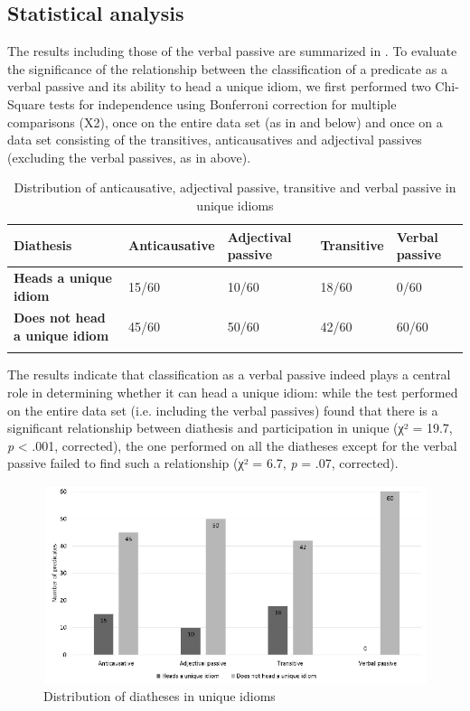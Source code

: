 \documentclass[output=paper]{langsci/langscibook}
\begin{document}
\subsection{Statistical analysis}  %

The results including those of the verbal passive are summarized in
. To evaluate the significance of the relationship between
the classification of a predicate as a verbal passive and its ability to head a
unique idiom, we first performed two Chi-Square tests for independence using
Bonferroni correction for multiple comparisons (X2), once on the entire data
set (as in  and  below) and once on a
data set consisting of the transitives, anticausatives and adjectival passives
(excluding the verbal passives, as in  above).

\begin{table}
\caption{Distribution of anticausative, adjectival passive,
transitive and verbal passive in unique idioms}\label{tab:key:20.2}
\begin{tabularx}{\textwidth}{lXXXX}
\lsptoprule
{\bfseries Diathesis} & {\bfseries Anti\-causative } & {\bfseries Adjectival passive} & {\bfseries Transitive} & {\bfseries Verbal passive}\\
\midrule
{\bfseries Heads a unique idiom} & 15/60 & 10/60 & 18/60 & 0/60\\
{\bfseries Does not head a unique idiom} & 45/60 & 50/60 & 42/60 & 60/60 \\
\lspbottomrule
\end{tabularx}
\end{table}

The results indicate that classification as a verbal passive indeed plays a
central role in determining whether it can head a unique idiom: while the test
performed on the entire data set (i.e. including the verbal passives) found
that there is a significant relationship between diathesis and participation in
unique  (χ² = 19.7, \emph{p} < .001, corrected), the one performed on all
the diatheses except for the verbal passive failed to find such a relationship
(χ² = 6.7, \emph{p} = .07, corrected).

\begin{figure}
    \caption{Distribution of diatheses in unique idioms}\label{fig:key:20.1}
    \includegraphics[width=\textwidth]{./img/20.1.eps}
\end{figure}
\end{document}
